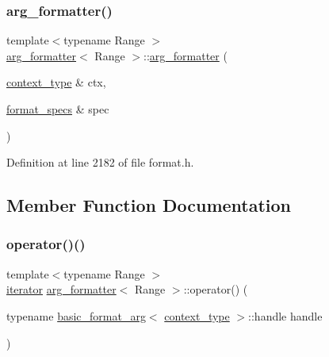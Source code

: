 \subsubsection{\texorpdfstring{arg\+\_\+formatter()}{arg\_formatter()}\hspace{0.1cm}{\footnotesize\ttfamily [2/2]}}
{\footnotesize\ttfamily template$<$typename Range $>$ \\
\hyperlink{classarg__formatter}{arg\+\_\+formatter}$<$ Range $>$\+::\hyperlink{classarg__formatter}{arg\+\_\+formatter} (\begin{DoxyParamCaption}\item[{\hyperlink{classbasic__format__context}{context\+\_\+type} \&}]{ctx,  }\item[{\hyperlink{classinternal_1_1arg__formatter__base_acff46f7da1afa536210eb77a2ea0d775}{format\+\_\+specs} \&}]{spec }\end{DoxyParamCaption})\hspace{0.3cm}{\ttfamily [inline]}}



Definition at line 2182 of file format.\+h.



\subsection{Member Function Documentation}
\mbox{\label{classarg__formatter_ac8ddd9b78934fc951916a30d46114ab1}} 
\subsubsection{\texorpdfstring{operator()()}{operator()()}}
{\footnotesize\ttfamily template$<$typename Range $>$ \\
\hyperlink{classarg__formatter_a8bdde3948f23cf63cdcb36b82a927199}{iterator} \hyperlink{classarg__formatter}{arg\+\_\+formatter}$<$ Range $>$\+::operator() (\begin{DoxyParamCaption}\item[{typename \hyperlink{classbasic__format__arg}{basic\+\_\+format\+\_\+arg}$<$ \hyperlink{classbasic__format__context}{context\+\_\+type} $>$\+::handle}]{handle }\end{DoxyParamCaption})\hspace{0.3cm}{\ttfamily [inline]}}


